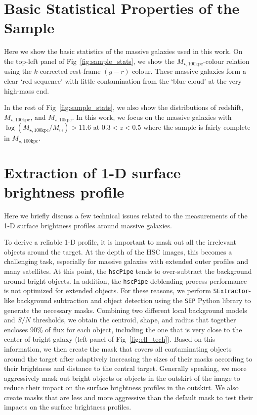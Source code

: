 \documentclass[fleqn,usenatbib]{mnras}
\def\minn{{$M_{\star,10\mathrm{kpc}}$}}
\def\mtot{{$M_{\star,100\mathrm{kpc}}$}}
\def\logmtot{{$\log (M_{\star,100\mathrm{kpc}}/M_{\odot})$}}
\begin{document}
   
\section{Basic Statistical Properties of the Sample} 
	\label{app:basic} 
    
    Here we show the basic statistics of the massive galaxies used in this work.
    On the top-left panel of Fig~\ref{fig:sample_stats}, we show the \mtot{}-colour 
    relation using the $k$-corrected rest-frame $(g-r)$ colour. 
    These massive galaxies form a clear `red sequence' with little contamination 
    from the `blue cloud' at the very high-mass end.
    
    In the rest of Fig~\ref{fig:sample_stats}, we also show the distributions of 
    redshift, \mtot{}, and \minn{}.
    In this work, we focus on the massive galaxies with \logmtot{}$>11.6$ at 
    $0.3 < z < 0.5$ where the sample is fairly complete in \mtot{}.
    
\section{Extraction of 1-D surface brightness profile} 
    \label{app:ellipse} 
    
    Here we briefly discuss a few technical issues related to the measurements of the 
    1-D surface brightness profiles around massive galaxies. 
    
    To derive a reliable 1-D profile, it is important to mask out all the irrelevant 
    objects around the target.
    At the depth of the HSC images, this becomes a challenging task, especially 
    for massive galaxies with extended outer profiles and many satellites. 
    At this point, the \texttt{hscPipe} tends to over-subtract the background around 
    bright objects.  
    In addition, the \texttt{hscPipe} deblending process performance is not optimized 
    for extended objects. 
    For these reasons, we perform \texttt{SExtractor}-like background subtraction and 
    object detection using the \texttt{SEP} Python library to generate the necessary 
    masks.
    Combining two different local background models and $S/N$ thresholds, we obtain 
    the centroid, shape, and radius that together encloses 90\% of flux for each 
    object, including the one that is very close to the center of bright galaxy 
    (left panel of Fig~\ref{fig:ell_tech}). 
    Based on this information, we then create the mask that covers all contaminating 
    objects around the target after adaptively increasing the sizes of their masks 
    according to their brightness and distance to the central target. 
    Generally speaking, we more aggressively mask out bright objects or objects in 
    the outskirt of the image to reduce their impact on the surface brightness 
    profiles in the outskirt. 
    We also create masks that are less and more aggressive than the default mask to 
    test their impacts on the surface brightness profiles. 
    
\end{document}
